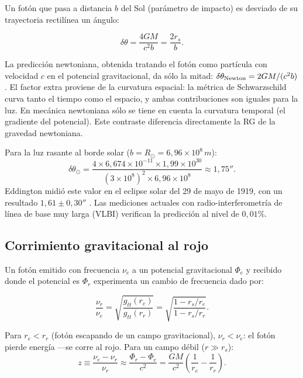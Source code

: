 Un fotón que pasa a distancia $b$ del Sol (parámetro de impacto) es desviado de su trayectoria rectilínea un ángulo:

\begin{equation}
  \boxed{\delta\theta = \frac{4GM}{c^2 b} = \frac{2r_s}{b}.}
  \label{eq:deflexion_luz}
\end{equation}

\begin{importante}
La predicción newtoniana, obtenida tratando el fotón como partícula con velocidad $c$ en el potencial gravitacional, da sólo la mitad: $\delta\theta_{\rm Newton} = 2GM/(c^2 b)$. El factor extra proviene de la curvatura espacial: la métrica de Schwarzschild curva tanto el tiempo como el espacio, y ambas contribuciones son iguales para la luz. En mecánica newtoniana sólo se tiene en cuenta la curvatura temporal (el gradiente del potencial). Este contraste diferencia directamente la RG de la gravedad newtoniana.
\end{importante}

Para la luz rasante al borde solar ($b = R_\odot = 6{,}96\times10^8\,\si{m}$):
\begin{equation}
  \delta\theta_\odot = \frac{4 \times 6{,}674\times10^{-11} \times 1{,}99\times10^{30}}{(3\times10^8)^2 \times 6{,}96\times10^8}
  \approx 1{,}75''.
\end{equation}
Eddington midió este valor en el eclipse solar del 29 de mayo de 1919, con un resultado $1{,}61 \pm 0{,}30''$ \cite{Misner1973}. Las mediciones actuales con radio-interferometría de línea de base muy larga (VLBI) verifican la predicción al nivel de $0{,}01\%$.

\subsection{Corrimiento gravitacional al rojo}

Un fotón emitido con frecuencia $\nu_e$ a un potencial gravitacional $\Phi_e$ y recibido donde el potencial es $\Phi_r$ experimenta un cambio de frecuencia dado por:

\begin{equation}
  \boxed{\frac{\nu_r}{\nu_e} = \sqrt{\frac{g_{tt}(r_e)}{g_{tt}(r_r)}} = \sqrt{\frac{1 - r_s/r_e}{1 - r_s/r_r}}.}
  \label{eq:redshift_grav}
\end{equation}

Para $r_e < r_r$ (fotón escapando de un campo gravitacional), $\nu_r < \nu_e$: el fotón pierde energía —se corre al rojo. Para un campo débil ($r \gg r_s$):
\begin{equation}
  z \equiv \frac{\nu_e - \nu_r}{\nu_r} \approx \frac{\Phi_r - \Phi_e}{c^2} = \frac{GM}{c^2}\!\left(\frac{1}{r_e} - \frac{1}{r_r}\right).
  \label{eq:redshift_debil}
\end{equation}

